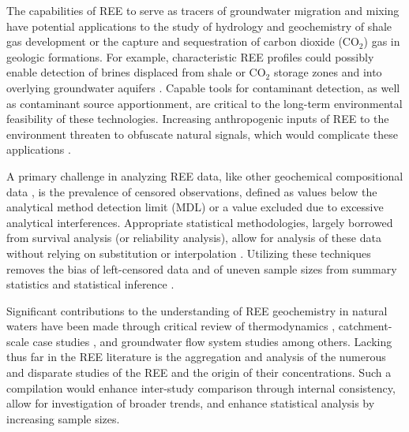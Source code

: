 The capabilities of REE to serve as tracers of groundwater migration and mixing have potential applications to the study of hydrology and geochemistry of shale gas development or the capture and sequestration of carbon dioxide (CO$_2$) gas in geologic formations.
For example, characteristic REE profiles could possibly enable detection of brines displaced from shale or CO$_2$ storage zones and into overlying groundwater aquifers \citep{Benson_Cole, Karamalidis_EST_2012, Chaudhuri_JOCGS_2011, Cheung_IJCG_2009}.
Capable tools for contaminant detection, as well as contaminant source apportionment, are critical to the long-term environmental feasibility of these technologies.
Increasing anthropogenic inputs of REE to the environment threaten to obfuscate natural signals, which would complicate these applications \citep{Kulaksiz_EI_2011, Kulaksiz_EPSL_2013}.

A primary challenge in analyzing REE data, like other geochemical compositional data \citep{Palarea_CompData_2011}, is the prevalence of censored observations, defined as values below the analytical method detection limit (MDL) or a value excluded due to excessive analytical interferences.
Appropriate statistical methodologies, largely borrowed from survival analysis (or reliability analysis), allow for analysis of these data without relying on substitution or interpolation \citep{Helsel_EST_1995}.
Utilizing these techniques removes the bias of left-censored data and of uneven sample sizes from summary statistics and statistical inference \citep{Helsel_EST_1995, Helsel_EST_2005}. 

Significant contributions to the understanding of REE geochemistry in natural waters have been made through critical review of thermodynamics \citep{Brookins_RMG_1989, Wood_CG_1990},
catchment-scale case studies \citep{Dia_GCA_2000, Gruau_WR_2004, Pourret_AG_2010, Ma_CG_2011},
and groundwater flow system studies \citep{Johannesson_GCA_1997, Johannesson_GCA_1999, Johannesson_CG_2000, Tang_CG_2006, Willis_CG_2011} among others.
Lacking thus far in the REE literature is the aggregation and analysis of the numerous and disparate studies of the REE and the origin of their concentrations.
Such a compilation would enhance inter-study comparison through internal consistency, allow for investigation of broader trends, and enhance statistical analysis by increasing sample sizes.

